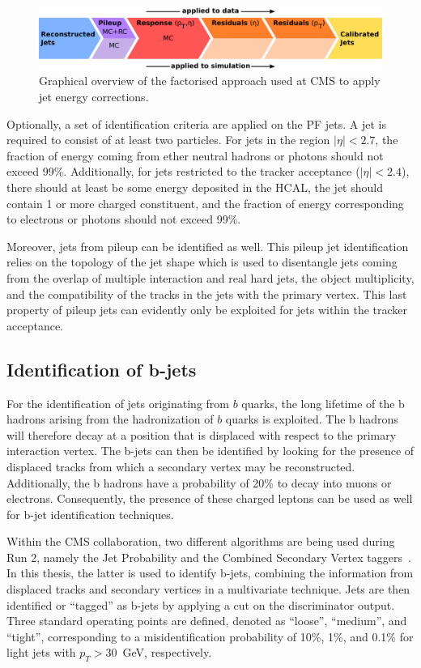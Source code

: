 \begin{figure}[ht]
  \centering
 \includegraphics[width=.85\textwidth]{JEC.pdf} 
 \caption{Graphical overview of the factorised approach used at \ac{CMS} to apply jet energy corrections.}
 \label{fig:JEC}
\end{figure}

Optionally, a set of identification criteria are applied on the \ac{PF} jets. A jet is required to consist of at least two particles. For jets in the region $|\eta| < 2.7$, the fraction of energy coming from ether neutral hadrons or photons should not exceed 99\%. Additionally, for jets restricted to the tracker acceptance ($|\eta| < 2.4$), there should at least be some energy deposited in the \ac{HCAL}, the jet should contain 1 or more charged constituent, and the fraction of energy corresponding to electrons or photons should not exceed 99\%.

Moreover, jets from pileup can be identified as well. This pileup jet identification relies on the topology of the jet shape which is used to disentangle jets coming from the overlap of multiple interaction and real hard jets, the object multiplicity, and the compatibility of the tracks in the jets with the primary vertex. This last property of pileup jets can evidently only be exploited for jets within the tracker acceptance.

\subsection{Identification of b-jets}
\label{sec:btagging}

For the identification of jets originating from $b$ quarks, the long lifetime of the b hadrons arising from the hadronization of $b$ quarks is exploited. The b hadrons will therefore decay at a position that is displaced with respect to the primary interaction vertex. The b-jets can then be identified by looking for the presence of displaced tracks from which a secondary vertex may be reconstructed. Additionally, the b hadrons have a probability of 20\% to decay into muons or electrons. Consequently, the presence of these charged leptons can be used as well for b-jet identification techniques.

Within the \ac{CMS} collaboration, two different algorithms are being used during Run 2, namely the Jet Probability and the Combined Secondary Vertex taggers~\cite{Chatrchyan:2012jua}. In this thesis, the latter is used to identify b-jets, combining the information from displaced tracks and secondary vertices in a multivariate technique. Jets are then identified or ``tagged'' as b-jets by applying a cut on the discriminator output. Three standard operating points are defined, denoted as ``loose'', ``medium'', and ``tight'', corresponding to a misidentification probability of 10\%, 1\%, and 0.1\% for light jets with $p_T > 30$~GeV, respectively.
